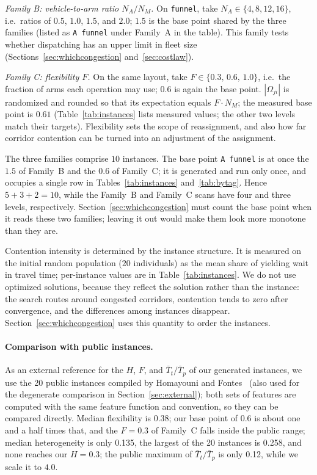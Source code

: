 \documentclass[manuscript,screen,review]{acmart}
\newcommand{\NCases}{10}
\newcommand{\PubFMed}{0.38}              %
\newcommand{\PubHMed}{0.135}             %
\newcommand{\PubHMax}{0.258}             %
\newcommand{\PubTtTpHi}{0.12}            %
\newcommand{\PubNInst}{20}
\begin{document}
\emph{Family B: vehicle-to-arm ratio $N_A/N_M$.}
On \texttt{funnel}, take $N_A\in\{4,8,12,16\}$, i.e.\ ratios of $0.5$, $1.0$, $1.5$, and $2.0$; $1.5$ is the base point shared by the three families (listed as \texttt{A funnel} under Family~A in the table).
This family tests whether dispatching has an upper limit in fleet size (Sections~\ref{sec:whichcongestion} and~\ref{sec:costlaw}).

\emph{Family C: flexibility $F$.}
On the same layout, take $F\in\{0.3,\,0.6,\,1.0\}$, i.e.\ the fraction of arms each operation may use; $0.6$ is again the base point.
$|\Omega_{ji}|$ is randomized and rounded so that its expectation equals $F\cdot N_M$; the measured base point is $0.61$ (Table~\ref{tab:instances} lists measured values; the other two levels match their targets).
Flexibility sets the scope of reassignment, and also how far corridor contention can be turned into an adjustment of the assignment.

The three families comprise $\NCases$ instances. The base point \texttt{A funnel} is at once the $1.5$ of Family~B and the $0.6$ of Family~C; it is generated and run only once, and occupies a single row in Tables~\ref{tab:instances} and~\ref{tab:bytag}.
Hence $5+3+2=\NCases$, while the Family~B and Family~C scans have four and three levels, respectively. Section~\ref{sec:whichcongestion} must count the base point when it reads these two families; leaving it out would make them look more monotone than they are.

Contention intensity is determined by the instance structure. It is measured on the initial random population ($20$ individuals) as the mean share of yielding wait in travel time; per-instance values are in Table~\ref{tab:instances}.
We do not use optimized solutions, because they reflect the solution rather than the instance: the search routes around congested corridors, contention tends to zero after convergence, and the differences among instances disappear.
Section~\ref{sec:whichcongestion} uses this quantity to order the instances.

\paragraph{Comparison with public instances.}
As an external reference for the $H$, $F$, and $\bar{T}_t/\bar{T}_p$ of our generated instances, we use the \PubNInst{} public instances compiled by Homayouni and Fontes~\cite{homayouni2021production} (also used for the degenerate comparison in Section~\ref{sec:external}); both sets of features are computed with the same feature function and convention, so they can be compared directly.
Median flexibility is \PubFMed{}; our base point of $0.6$ is about one and a half times that, and the $F=0.3$ of Family~C falls inside the public range;
median heterogeneity is only \PubHMed{}, the largest of the \PubNInst{} instances is \PubHMax{}, and none reaches our $H=0.3$;
the public maximum of $\bar{T}_t/\bar{T}_p$ is only \PubTtTpHi{}, while we scale it to $4.0$.
\end{document}
